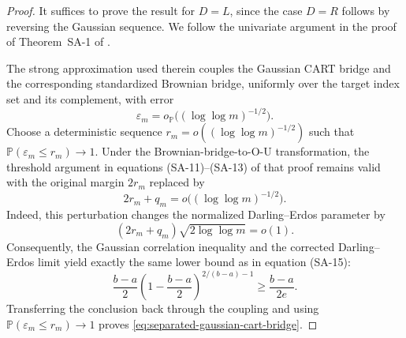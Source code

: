 \documentclass[11pt]{article}
\theoremstyle{plain}
\theoremstyle{definition}
\theoremstyle{remark}
\theoremstyle{plain}
\renewcommand{\P}{\mathbb{P}}
\newcommand{\1}{\mathbbm{1}}
\begin{document}
\begin{proof}
It suffices to prove the result for $D=L$, since the case $D=R$
follows by reversing the Gaussian sequence. We follow the univariate
argument in the proof of Theorem~SA-1 of \citet{cattaneo2025honest}.

The strong approximation used therein couples the Gaussian CART bridge
and the corresponding standardized Brownian bridge, uniformly over the
target index set and its complement, with error
\[
    \varepsilon_m
    =
    o_{\P}\bigl((\log\log m)^{-1/2}\bigr).
\]
Choose a deterministic sequence
$r_m=o((\log\log m)^{-1/2})$ such that
$\P(\varepsilon_m\le r_m)\to1$. Under the Brownian-bridge-to-O-U
transformation, the threshold argument in equations
(SA-11)--(SA-13) of that proof remains valid with the original margin
$2r_m$ replaced by
\[
    2r_m+q_m
    =
    o\bigl((\log\log m)^{-1/2}\bigr).
\]
Indeed, this perturbation changes the normalized Darling--Erdos
parameter by
\[
    (2r_m+q_m)\sqrt{2\log\log m}=o(1).
\]
Consequently, the Gaussian correlation inequality and the corrected
Darling--Erdos limit yield exactly the same lower bound as in
equation (SA-15):
\[
    \frac{b-a}{2}
    \left(1-\frac{b-a}{2}\right)^{2/(b-a)-1}
    \ge
    \frac{b-a}{2e}.
\]
Transferring the conclusion back through the coupling and using
$\P(\varepsilon_m\le r_m)\to1$ proves
\eqref{eq:separated-gaussian-cart-bridge}.
\end{proof}
\end{document}

